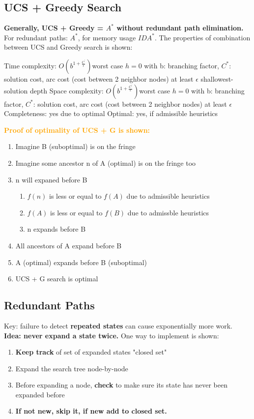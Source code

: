 \subsection{UCS + Greedy Search}
\textbf{Generally, UCS + Greedy = $A^{*}$ without redundant path elimination.} For redundant paths: $A^{*}$, for memory usage $IDA^{*}.$ The properties of combination between UCS and Greedy search is shown: \\
\begin{outline}
    \1 Time complexity: $O(b^{1+\frac{C^{\prime}}{\epsilon}})$worst case $h=0$
        \2 with b: branching factor, $C^{*}$: solution cost, arc cost (cost between 2 neighbor nodes) at least $\epsilon$ shallowest-solution depth
    \1 Space complexity: $O(b^{1+\frac{C^{\prime}}{\epsilon}})$worst case $h=0$
        \2 with b: branching factor, $C^{*}$: solution cost, arc cost (cost between 2 neighbor nodes) at least $\epsilon$
    \1 Completeness: yes due to optimal
    \1 Optimal: yes, if admissible heuristics
\end{outline}

\noindent
\textcolor{orange}{\textbf{Proof of optimality of UCS + G is shown:}}
\begin{enumerate}
    \item Imagine B (suboptimal) is on the fringe
    \item Imagine some ancestor n of A (optimal) is on the fringe too
    \item n will expaned before B
    \begin{enumerate}
        \item $f(n)$ is less or equal to $f(A)$ due to admissible heuristics
        \item $f(A)$ is less or equal to $f(B)$ due to admissble heuristics
        \item n expands before B
    \end{enumerate}
    \item All ancestors of A expand before B
    \item A (optimal) expands before B (suboptimal)
    \item UCS + G search is optimal
\end{enumerate}

\subsection{Redundant Paths}
Key: failure to detect \textbf{repeated states} can cause exponentially more work. \textbf{Idea: never expand a state twice.} One way to implement is shown:
\begin{enumerate}
    \item \textbf{Keep track} of set of expanded states "closed set"
    \item Expand the search tree node-by-node
    \item Before expanding a node, \textbf{check} to make sure its state has never been expanded before
    \item \textbf{If not new, skip it, if new add to closed set.}
\end{enumerate}

